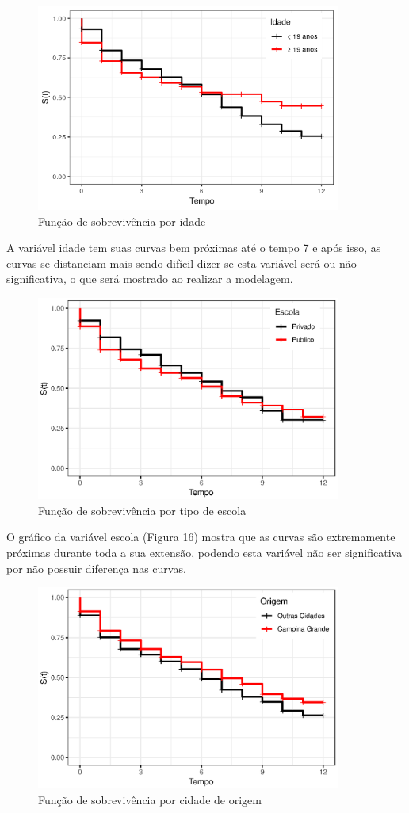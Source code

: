 \documentclass[a4paper,12pt]{article}
\begin{document}
\begin{figure}[H]
\centering
\includegraphics[width=10cm]{exp_quim_ida}
\caption{Função de sobrevivência por idade}
\end{figure}

A variável idade tem suas curvas bem próximas até o tempo 7 e após isso, as curvas se distanciam mais sendo difícil dizer se esta variável será ou não significativa, o que será mostrado ao realizar a modelagem.

\begin{figure}[H]
\centering
\includegraphics[width=10cm]{exp_quim_esc}
\caption{Função de sobrevivência por tipo de escola}
\end{figure}

O gráfico da variável escola (Figura 16) mostra que as curvas são extremamente próximas durante toda a sua extensão, podendo esta variável não ser significativa por não possuir diferença nas curvas.

\begin{figure}[H]
\centering
\includegraphics[width=10cm]{exp_quim_ori}
\caption{Função de sobrevivência por cidade de origem}
\end{figure}
\end{document}
